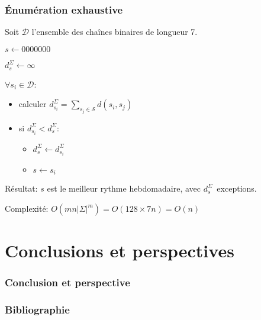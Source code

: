 \documentclass[table]{beamer}
\newcommand{\+}{\cellcolor[gray]{1}\bfseries}
\newcommand{\<}{\cellcolor[gray]{0.8}\rmfamily\itshape}
\def\S{\mathcal{S}}
\begin{document}
\begin{frame}
  \frametitle{Énumération exhaustive}

  Soit $\mathcal{D}$ l'ensemble des chaînes binaires de longueur 7.

  $s \leftarrow 0000000$

  $d^\Sigma_s \leftarrow \infty$

  $\forall s_i \in \mathcal{D}$: 
  \begin{itemize}
  \item calculer
    \begin{math}
      \displaystyle
      d^\Sigma_{s_i} = \sum_{s_j\in\S} d(s_i, s_j)
    \end{math} 
  \item si $d^\Sigma_{s_i} < d^\Sigma_s$:
    \begin{itemize}
    \item $d^\Sigma_s \leftarrow d^\Sigma_{s_i}$
    \item $s \leftarrow s_i$
    \end{itemize}
  \end{itemize}

  Résultat: $s$ est le meilleur rythme hebdomadaire, avec
  $d^\Sigma_s$~exceptions.\pause

  \vspace{2ex}

  Complexité: $O(mn|\Sigma|^m) = O(128 \times 7n) = O(n)$
\end{frame}

\section{Conclusions et perspectives}

\begin{frame}
  \frametitle{Conclusion et perspective}

\end{frame}

\begin{frame}
  \titlepage
\end{frame}

\appendix

\begin{frame}[allowframebreaks]
  \frametitle{Bibliographie}
  
  
\end{frame}
\end{document}
